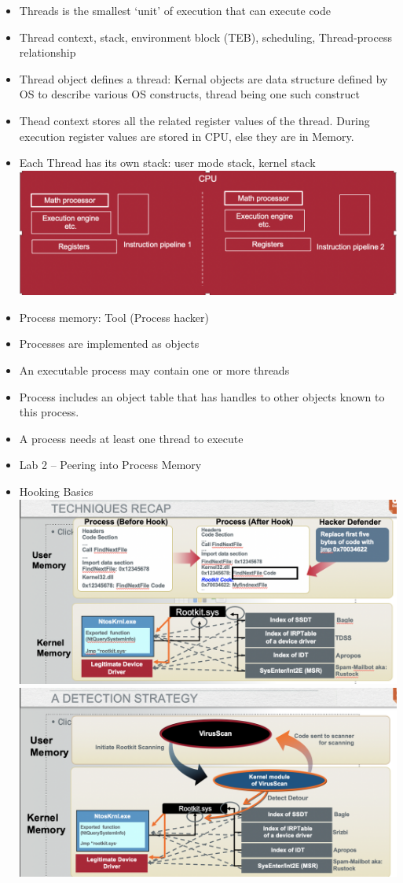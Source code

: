 \documentclass[12pt]{article}
\begin{document}
\begin{itemize}
\item Threads is the smallest ‘unit’ of execution that can execute code
\item Thread context, stack, environment block (TEB), scheduling, Thread-process relationship
\item Thread object defines a thread: Kernal objects are data structure defined by OS to describe various OS constructs, thread being one such construct
\item Thead context stores all the related register values of the thread. During execution register values are stored in CPU, else they are in Memory.
\item Each Thread has its own stack: user mode stack, kernel stack
\includegraphics{4.png}
\item Process memory: Tool (Process hacker)
\item Processes are implemented as objects
\item An executable process may contain one or more threads
\item Process includes an object table that has handles to other objects known to this process.
\item A process needs at least one thread to execute
\item Lab 2 – Peering into Process Memory
\item Hooking Basics
\includegraphics{5.png}
\includegraphics{6.png}

\end{itemize}
\end{document}
